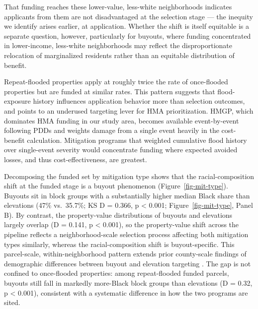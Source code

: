 \documentclass[
  authoryear,
  preprint]{elsarticle}
\begin{document}
That funding reaches these lower-value, less-white neighborhoods
indicates applicants from them are not disadvantaged at the selection
stage --- the inequity we identify arises earlier, at application.
Whether the shift is itself equitable is a separate question, however,
particularly for buyouts, where funding concentrated in lower-income,
less-white neighborhoods may reflect the disproportionate relocation of
marginalized residents rather than an equitable distribution of benefit.

Repeat-flooded properties apply at roughly twice the rate of
once-flooded properties but are funded at similar rates. This pattern
suggests that flood-exposure history influences application behavior
more than selection outcomes, and points to an underused targeting lever
for HMA prioritization. HMGP, which dominates HMA funding in our study
area, becomes available event-by-event following PDDs and weights damage
from a single event heavily in the cost-benefit calculation. Mitigation
programs that weighted cumulative flood history over single-event
severity would concentrate funding where expected avoided losses, and
thus cost-effectiveness, are greatest.

Decomposing the funded set by mitigation type shows that the
racial-composition shift at the funded stage is a buyout phenomenon
(Figure~\ref{fig-mit-type}). Buyouts sit in block groups with a
substantially higher median Black share than elevations (47\%
vs.~35.7\%; KS D = 0.366, p \textless{} 0.001;
Figure~\ref{fig-mit-type}, Panel B). By contrast, the property-value
distributions of buyouts and elevations largely overlap (D = 0.141, p
\textless{} 0.001), so the property-value shift across the pipeline
reflects a neighborhood-scale selection process affecting both
mitigation types similarly, whereas the racial-composition shift is
buyout-specific. This parcel-scale, within-neighborhood pattern extends
prior county-scale findings of demographic differences between buyout
and elevation targeting
\citep{machManagedRetreatVoluntary2019, elliottRacialInequitiesFederal2020a, frankFEMAHomeElevation2022}.
The gap is not confined to once-flooded properties: among repeat-flooded
funded parcels, buyouts still fall in markedly more-Black block groups
than elevations (D = 0.32, p \textless{} 0.001), consistent with a
systematic difference in how the two programs are sited.
\end{document}

